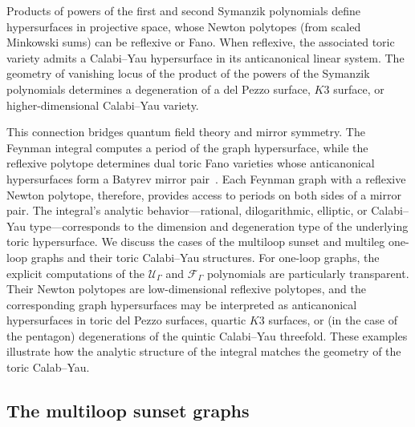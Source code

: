 \documentclass[12pt,a4paper]{article}
\theoremstyle{plain}
\theoremstyle{remark}
\newcommand{\cU}{\mathscr {U}}
\newcommand{\cF}{\mathscr {F}}
\begin{document}
Products of powers of the first and second Symanzik polynomials define hypersurfaces in projective space, whose Newton polytopes (from scaled Minkowski sums) can be reflexive or Fano. When reflexive, the associated toric variety admits a Calabi--Yau hypersurface in its anticanonical linear system. The geometry of vanishing locus of the product of the powers of the Symanzik polynomials determines a degeneration of a del Pezzo surface, $K3$ surface, or higher-dimensional Calabi--Yau variety. 

This connection bridges quantum field theory and mirror symmetry. The Feynman integral computes a period of the graph hypersurface, while the reflexive polytope determines dual toric Fano varieties whose anticanonical hypersurfaces form a Batyrev mirror pair~\cite{Batyrev:1993oya}. Each Feynman graph with a reflexive Newton polytope, therefore, provides access to periods on both sides of a mirror pair. The integral's analytic behavior---rational, dilogarithmic, elliptic, or Calabi--Yau type---corresponds to the dimension and degeneration type of the underlying toric hypersurface.
We discuss  the  cases of the multiloop sunset and multileg one-loop graphs and their toric Calabi--Yau structures.
For one-loop graphs, the explicit computations of the
$\cU_\Gamma$ and $\cF_\Gamma$ polynomials are particularly transparent.  Their Newton
polytopes are  low-dimensional reflexive polytopes, and the corresponding
graph hypersurfaces may be interpreted as anticanonical hypersurfaces in
toric del Pezzo surfaces, quartic $K3$ surfaces, or (in the case of the
pentagon) degenerations of the quintic Calabi--Yau threefold.  These
examples illustrate how the analytic structure of the integral matches
the geometry of the toric Calab--Yau.


\subsection{The multiloop sunset graphs}\label{sec:sunsetmirror}
\end{document}
